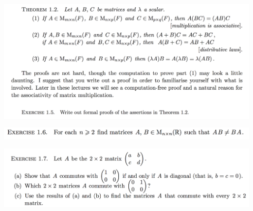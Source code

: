 \documentclass[12pt]{article}
\begin{document}
\begin{mdframed}
\includegraphics[width=400pt]{img/oxford-prelims-M1-linear-algebra-1-5.png}
\end{mdframed}

\begin{mdframed}
\includegraphics[width=400pt]{img/oxford-prelims-M1-linear-algebra-1-6.png}
\end{mdframed}

\begin{mdframed}
\includegraphics[width=400pt]{img/oxford-prelims-M1-linear-algebra-1-7.png}
\end{mdframed}
\end{document}
